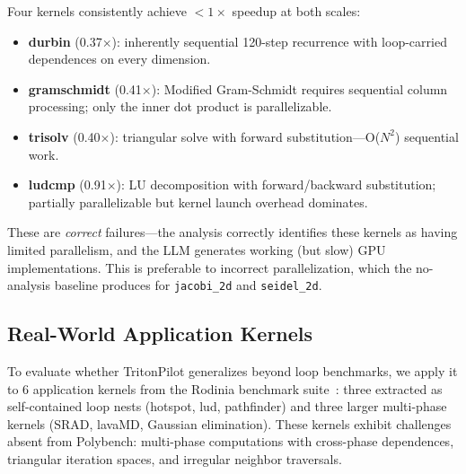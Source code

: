 \documentclass[sigconf]{acmart}
\newcommand{\sysname}{TritonPilot\xspace}
\begin{document}
Four kernels consistently achieve $<1\times$ speedup at both scales:

\begin{itemize}
  \item \textbf{durbin} (0.37$\times$): inherently sequential
    120-step recurrence with loop-carried dependences on every
    dimension.
  \item \textbf{gramschmidt} (0.41$\times$): Modified Gram-Schmidt
    requires sequential column processing; only the inner dot product
    is parallelizable.
  \item \textbf{trisolv} (0.40$\times$): triangular solve with
    forward substitution---O($N^2$) sequential work.
  \item \textbf{ludcmp} (0.91$\times$): LU decomposition with
    forward/backward substitution; partially parallelizable but
    kernel launch overhead dominates.
\end{itemize}

These are \emph{correct} failures---the analysis correctly identifies
these kernels as having limited parallelism, and the LLM generates
working (but slow) GPU implementations.  This is preferable to
incorrect parallelization, which the no-analysis baseline produces
for \texttt{jacobi\_2d} and \texttt{seidel\_2d}.


\subsection{Real-World Application Kernels}
\label{sec:realworld}

To evaluate whether \sysname generalizes beyond loop benchmarks, we
apply it to 6 application kernels from the Rodinia benchmark
suite~\cite{che2009rodinia}: three extracted as self-contained loop
nests (hotspot, lud, pathfinder) and three larger multi-phase kernels
(SRAD, lavaMD, Gaussian elimination).  These kernels exhibit
challenges absent from Polybench: multi-phase computations with
cross-phase dependences, triangular iteration spaces, and irregular
neighbor traversals.
\end{document}
